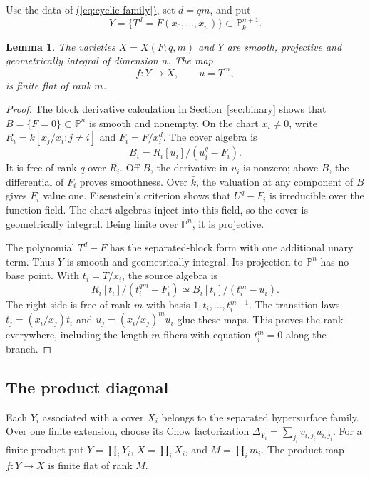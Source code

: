 \documentclass[11pt,a4paper]{article}
\newtheorem{lemma}[theorem]{Lemma}
\theoremstyle{definition}
\theoremstyle{remark}\newtheorem{remark}[theorem]{Remark}
\numberwithin{equation}{section}
\newcommand{\PP}{\mathbb P}\newcommand{\LL}{\mathbb L}
\newcommand{\secref}[1]{\hyperref[#1]{\textcolor{sectionlink}{Section~\ref*{#1}}}}
\renewcommand{\eqref}[1]{\hyperref[#1]{\textcolor{equationlink}{(\ref*{#1})}}}
\begin{document}
Use the data of \eqref{eq:cyclic-family}, set $d=qm$, and put
\[
                  Y=\{T^d=F(x_0,\ldots,x_n)\}\subset\PP^{n+1}_k.
\]

\begin{lemma}\label{lem:cyclic-cover}
The varieties $X=X(F;q,m)$ and $Y$ are smooth, projective and
geometrically integral of dimension $n$. The map
\begin{equation}\label{eq:finite-cyclic}
                    f:Y\longrightarrow X,\qquad u=T^m,
\end{equation}
is finite flat of rank $m$.
\end{lemma}

\begin{proof}
The block derivative calculation in \secref{sec:binary} shows
that $B=\{F=0\}\subset\PP^n$ is smooth and nonempty. On the
chart $x_i\ne0$, write $R_i=k[x_j/x_i:j\ne i]$ and
$F_i=F/x_i^d$. The cover algebra is
\[
                      B_i=R_i[u_i]/(u_i^q-F_i).
\]
It is free of rank $q$ over $R_i$. Off $B$, the derivative in
$u_i$ is nonzero; above $B$, the differential of $F_i$ proves
smoothness. Over $\bar k$, the valuation at any component of
$B$ gives $F_i$ value one. Eisenstein's criterion shows that
$U^q-F_i$ is irreducible over the function field. The chart
algebras inject into this field, so the cover is geometrically
integral. Being finite over $\PP^n$, it is projective.

The polynomial $T^d-F$ has the separated-block form with one
additional unary term. Thus $Y$ is smooth and geometrically
integral. Its projection to $\PP^n$ has no base point. With
$t_i=T/x_i$, the source algebra is
\begin{equation}\label{eq:cyclic-algebra}
 R_i[t_i]/(t_i^{qm}-F_i)\simeq B_i[t_i]/(t_i^m-u_i).
\end{equation}
The right side is free of rank $m$ with basis
$1,t_i,\ldots,t_i^{m-1}$. The transition laws
$t_j=(x_i/x_j)t_i$ and $u_j=(x_i/x_j)^m u_i$ glue these maps.
This proves the rank everywhere, including the length-$m$
fibers with equation $t_i^m=0$ along the branch.
\end{proof}

\subsection{The product diagonal}\label{proof:cyclic}

Each $Y_i$ associated with a cover $X_i$ belongs to the separated
hypersurface family. Over one finite extension, choose its Chow
factorization $\Delta_{Y_i}=\sum_{j_i}v_{i,j_i}u_{i,j_i}$.
For a finite product put
$Y=\prod_iY_i$, $X=\prod_iX_i$, and $M=\prod_i m_i$.
The product map $f:Y\to X$ is finite flat of rank $M$.
\end{document}
